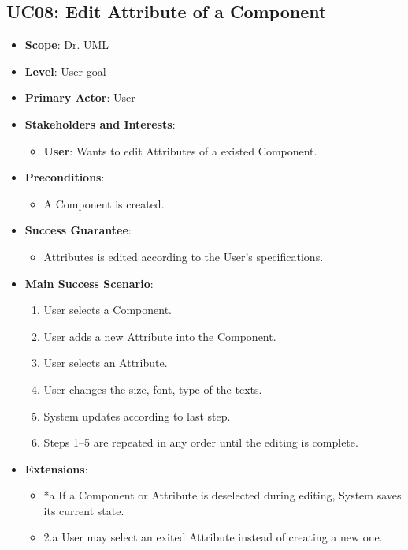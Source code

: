 \documentclass[12pt]{article}
\begin{document}
    \subsection{UC08: Edit Attribute of a Component}
    \begin{itemize}
        \item \textbf{Scope}: Dr. UML
        \item \textbf{Level}: User goal
        \item \textbf{Primary Actor}: User
        \item \textbf{Stakeholders and Interests}:
        \begin{itemize}
            \item \textbf{User}: Wants to edit Attributes of a existed Component.
        \end{itemize}
        \item \textbf{Preconditions}:
        \begin{itemize}
            \item A Component is created.
        \end{itemize}
        \item \textbf{Success Guarantee}:
        \begin{itemize}
            \item Attributes is edited according to the User’s specifications.
        \end{itemize}
        \item \textbf{Main Success Scenario}:
        \begin{enumerate}
            \item User selects a Component.
            \item User adds a new Attribute into the Component.
            \item User selects an Attribute.
            \item User changes the size, font, type of the texts.
            \item System updates according to last step.
            \item Steps 1--5 are repeated in any order until the editing is complete.
        \end{enumerate}
        \item \textbf{Extensions}:
        \begin{itemize}
            \item *a If a Component or Attribute is deselected during editing, System saves its current state.
            \item 2.a User may select an exited Attribute instead of creating a new one.

\end{itemize}
\end{itemize}
\end{document}
